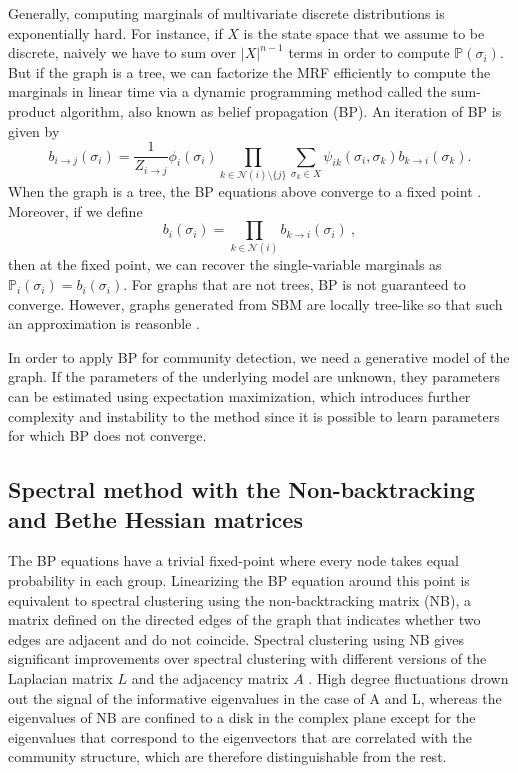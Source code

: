 \documentclass{article} \usepackage{iclr2019_conference,times}
\begin{document}
Generally, computing marginals of multivariate discrete distributions is exponentially hard.  For instance, if $X$ is the state space that we assume to be discrete, naively we have to sum over $|X|^{n-1}$ terms in order to compute $\mathbb{P}(\sigma_i)$. But if the graph is a tree, we can factorize the MRF efficiently to compute the marginals in linear time via a dynamic programming method called the sum-product algorithm, also known as belief propagation (BP).  An iteration of BP is given by 
\begin{equation}
\label{bpeqs}
     b_{i \rightarrow j}(\sigma_i) = \frac{1}{Z_{i\rightarrow j}} \phi_i(\sigma_i) \displaystyle \prod_{k \in \mathcal{N}(i)\setminus \{j\}} \displaystyle \sum_{\sigma_k \in X}\psi_{ik}(\sigma_i, \sigma_k) b_{k \rightarrow i}(\sigma_k).
\end{equation} 
When the graph is a tree, the BP equations above converge to a fixed point \citep{information2009mezard}. 
Moreover, if we define
\begin{equation}
    b_i(\sigma_i) = \prod_{k \in \mathcal{N}(i)} b_{k \rightarrow i}(\sigma_i)~,
\end{equation}
then at the fixed point, we can recover the single-variable marginals as $\mathbb{P}_i(\sigma_i) = b_i(\sigma_i)$.
For graphs that are not trees, BP is not guaranteed to converge.
However, graphs generated from SBM are locally tree-like so that such an approximation is reasonble \citep{abbe2017community}.


In order to apply BP for community detection, we need a generative model of the graph.  If the parameters of the underlying model are unknown, they parameters can be estimated using expectation maximization, which introduces further complexity and instability to the method since it is possible to learn parameters for which BP does not converge. 








\subsection{Spectral method with the Non-backtracking and Bethe Hessian matrices}
\label{app.spectral}

The BP equations have a trivial fixed-point where every node takes equal probability in each group. Linearizing the BP equation around this point is equivalent to spectral clustering using the non-backtracking matrix (NB), a matrix defined on the directed edges of the graph that indicates whether two edges are adjacent and do not coincide. Spectral clustering using NB gives significant improvements over spectral clustering with different versions of the Laplacian matrix $L$ and the adjacency matrix $A$ \citep{krzakala2013spectral}. High degree fluctuations drown out the signal of the informative eigenvalues in the case of A and L, whereas the eigenvalues of NB are confined to a disk in the complex plane except for the eigenvalues that correspond to the eigenvectors that are correlated with the community structure, which are therefore distinguishable from the rest.   
\end{document}

